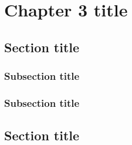 \chapter{Chapter 3 title}
\section{Section title} 
\blindtext
\subsection{Subsection title}
\blindtext
\subsection{Subsection title}
\blindtext
\section{Section title} 
\blindtext